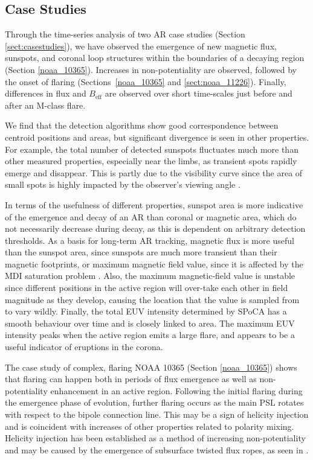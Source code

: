 {\subsection{Case Studies}
Through the time-series analysis of two \gls{AR} case studies (Section \ref{sect:casestudies}), we have observed the emergence of new magnetic flux, sunspots, and coronal loop structures within the boundaries of a decaying region (Section \ref{noaa_10365}). Increases in non-potentiality are observed, followed by the onset of flaring (Sections~\ref{noaa_10365} and \ref{sect:noaa_11226}). Finally, differences in flux and $B_{\mathrm{eff}}$ are observed over short time-scales just before and after an M-class flare. 

We find that the detection algorithms show good correspondence between centroid positions and areas, but significant divergence is seen in other properties. For example, the total number of detected sunspots fluctuates much more than other measured properties, especially near the limbs, as transient spots rapidly emerge and disappear. This is partly due to the visibility curve since the area of small spots is highly impacted by the observer's viewing angle \citep{Dalla:2008,Watson:2009}.  

In terms of the usefulness of different properties, sunspot area is more indicative of the emergence and decay of an \gls{AR} than coronal or magnetic area, which do not necessarily decrease during decay, as this is dependent on arbitrary detection thresholds. As a basis for long-term \gls{AR} tracking, magnetic flux is more useful than the sunspot area, since sunspots are much more transient than their magnetic footprints, or maximum magnetic field value, since it is affected by the \gls{MDI} saturation problem \citep{Liu:2007}. Also, the maximum magnetic-field value is unstable since different positions in the active region will over-take each other in field magnitude as they develop, causing the location that the value is sampled from to vary wildly. Finally, the total \gls{EUV} intensity determined by \gls{SPoCA} has a smooth behaviour over time and is closely linked to area. The maximum \gls{EUV} intensity peaks when the active region emits a large flare, and appears to be a useful indicator of eruptions in the corona.

The case study of complex, flaring \gls{NOAA} 10365 (Section \ref{noaa_10365}) shows that flaring can happen both in periods of flux emergence as well as non-potentiality enhancement in an active region. Following the initial flaring during the emergence phase of evolution, further flaring occurs as the main \gls{PSL} rotates with respect to the bipole connection line. This may be a sign of helicity injection and is coincident with increases of other properties related to polarity mixing. Helicity injection has been established as a method of increasing non-potentiality and may be caused by the emergence of subsurface twisted flux ropes, as seen in \citet{Dun:2007}.

}

